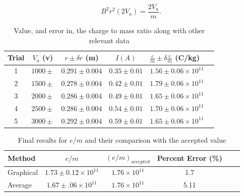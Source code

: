 \documentclass[prb,preprint]{revtex4-1}
\begin{document}
	\begin{equation}
		\label{eq:lincurve}
		B^2r^2(2V_a) = \frac{2V_a}{m}.
	\end{equation}

	\begin{table}[h]
		\centering
		\caption{Value, and error in, the charge to mass ratio along with other relevant data}
		\begin{ruledtabular}
		\begin{tabular}{c c c c l p{20cm}}
		Trial & $V_a$ (v) & $r\pm \delta r$ (m) & $I(A)$ & $\frac{e}{m}\pm \delta\frac{e}{m}$ (C/kg)\\
		\hline
		1 & $1000\pm$ & $0.291\pm0.004$ & $ 0.35\pm0.01 $ & $1.56\pm0.06\times10^{11}$\\
		2 & $1500\pm$ & $0.278\pm0.004$ & $ 0.42\pm0.01 $ & $1.79\pm0.06\times10^{11}$\\
		3 & $2000\pm$ & $0.286\pm0.004$ & $ 0.49\pm0.01 $ & $1.65\pm0.06\times10^{11}$\\
		4 & $2500\pm$ & $0.286\pm0.004$ & $ 0.54\pm0.01 $ & $1.70\pm0.06\times10^{11}$\\
		5 & $3000\pm$ & $0.292\pm0.004$ & $ 0.59\pm0.01 $ & $1.65\pm0.06\times10^{11}$\\
		\end{tabular}
		\end{ruledtabular}
		\label{e/m by v}
	\end{table}

	\begin{table}[h!]
		\centering
		\caption{Final results for $e/m$ and their comparison with the accepted value}
		\begin{ruledtabular}
		\begin{tabular}{l c c c c p{5cm}}
		Method & $e/m$ & $(e/m)_{accepted}$ & Percent Error (\%)\\
		\hline
		Graphical & $1.73\pm0.12\times10^{11}$ & $1.76\times10^{11}$ & 1.7\\
		Average & $1.67\pm.06\times10^{11}$ & $1.76\times10^{11}$ & 5.11
		\end{tabular}
		\end{ruledtabular}
		\label{final results}
	\end{table}
\end{document}
